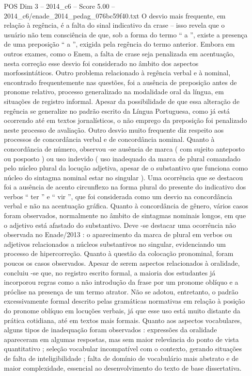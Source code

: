 \begin{textsample}{POS Dim 3 – 2014\_c6 – Score 5.00 – 2014\_c6/enade\_2014\_pedag\_076bc59f40.txt}
O desvio mais frequente, em relação à regência, é a falta do sinal indicativo da crase – isso revela que o usuário não tem consciência de que, sob a forma do termo “ a ”, existe a presença de uma preposição “ a ”, exigida pela regência do termo anterior.
Embora em outros exames, como o Enem, a falta de crase seja penalizada em acentuação, nesta correção esse desvio foi considerado no âmbito dos aspectos morfossintáticos.
Outro problema relacionado à regência verbal e à nominal, encontrado frequentemente nas questões, foi a ausência de preposição antes de pronome relativo, processo generalizado na modalidade oral da língua, em situações de registro informal.
Apesar da possibilidade de que essa alteração de regência se generalize no padrão escrito da Língua Portuguesa, como já está ocorrendo até em textos jornalísticos, o não emprego da preposição foi penalizado neste processo de avaliação.
Outro desvio muito frequente diz respeito aos processos de concordância verbal e de concordância nominal.
Quanto à concordância de número, observou -se ausência de marca ( com sujeito anteposto ou posposto ) ou uso indevido ( uso inadequado da marca de plural comandado pelo núcleo plural da locução adjetiva, apesar de o substantivo que funciona como núcleo do sintagma nominal estar no singular ).
Uma ocorrência que se destacou foi a ausência de acento circunflexo na forma plural do presente do indicativo dos verbos “ ter ” e “ vir ”, que foi considerada como um desvio na concordância verbal e não na acentuação gráfica.
Quanto à concordância de gênero, vários casos foram observados, normalmente no âmbito de sintagmas nominais longos, em que o adjetivo está afastado do substantivo.
Deve -se destacar uma ocorrência não observada no Enade/2013 : o aparecimento da marca de plural em verbos ou adjetivos relacionados a núcleos substantivos no singular, evidenciando um processo de hipercorreção.
Quanto à questão da colocação pronominal, foram poucos os casos observados.
Apesar de serem aspectos relacionados à oralidade, concluiu -se que, no registro escrito formal, a maioria dos estudantes já incorporou regras como a não introdução da frase por um pronome oblíquo e a próclise na presença de um termo atrator.
Não se adotou, entretanto, o padrão excessivamente formal descrito pelas gramáticas normativas em relação à posição do pronome oblíquo em locuções verbais, já que esse uso está muito distante da prática cotidiana, até em textos mais formais.
Quanto aos aspectos vocabulares, alguns tipos de inadequação foram observados : expressões da oralidade apareceram em algumas respostas, mas sem maior relevância do ponto de vista quantitativo ; seleção vocabular incompatível com o contexto, gerando situações de falta de inteligibilidade ; falta de domínio de vocabulário mais abstrato e de maior complexidade, essencial ao desenvolvimento do texto de base dissertativa.

\end{textsample}

